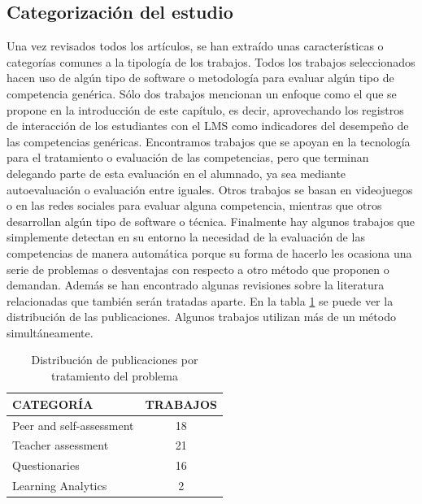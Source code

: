 \subsection{Categorización del estudio}

Una vez revisados todos los artículos, se han extraído unas características o categorías comunes a la tipología de los trabajos. Todos los trabajos seleccionados hacen uso de algún tipo de software o metodología para evaluar algún tipo de competencia genérica. Sólo dos trabajos mencionan un enfoque como el que se propone en la introducción de este capítulo, es decir, aprovechando los registros de interacción de los estudiantes con el LMS como indicadores del desempeño de las competencias genéricas. Encontramos trabajos que se apoyan en la tecnología para el tratamiento o evaluación de las competencias, pero que terminan delegando parte de esta evaluación en el alumnado, ya sea mediante autoevaluación o evaluación entre iguales. Otros trabajos se basan en videojuegos o en las redes sociales para evaluar alguna competencia, mientras que otros desarrollan algún tipo de software o técnica. Finalmente hay algunos trabajos que simplemente detectan en su entorno la necesidad de la evaluación de las competencias de manera automática porque su forma de hacerlo les ocasiona una serie de problemas o desventajas con respecto a otro método que proponen o demandan. Además se han encontrado algunas revisiones sobre la literatura relacionadas que también serán tratadas aparte.  En la tabla \ref{tab:PublicacionesForum} se puede ver la distribución de las publicaciones. Algunos trabajos utilizan más de un método simultáneamente. %

\begin{table}
  \begin{center}
  \begin{tabular}{| m{10cm} | c |}
    \hline
    CATEGORÍA & TRABAJOS\\
    \hline
    \hline 
    Peer and self-assessment & 18\\
    \hline
    Teacher assessment & 21\\
    \hline
    Questionaries & 16\\
    \hline
    Learning Analytics & 2\\
    \hline
  \end{tabular}
\end{center}
\caption{Distribución de publicaciones por tratamiento del problema}
\label{tab:PublicacionesForum}
\end{table} 

